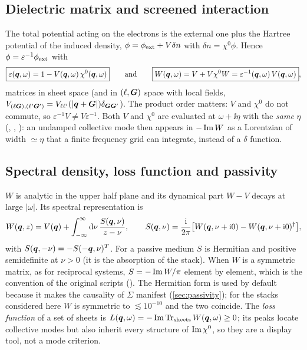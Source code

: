 \subsection{Dielectric matrix and screened interaction}

The total potential acting on the electrons is the external one plus the Hartree potential of the induced
density, $\phi=\phi_{\rm ext}+V\delta n$ with $\delta n=\chi^0\phi$. Hence $\phi=\varepsilon^{-1}\phi_{\rm ext}$ with
\begin{equation}
\boxed{\varepsilon(\bm q,\omega)=1-V(\bm q,\omega)\,\chi^0(\bm q,\omega)}
\qquad\text{and}\qquad
\boxed{W(\bm q,\omega)=V+V\chi^0W=\varepsilon^{-1}(\bm q,\omega)\,V(\bm q,\omega)} ,
\label{eq:epsW}
\end{equation}
matrices in sheet space (and in $(\ell,\bm G)$ space with local fields, $V_{(\ell\bm G),(\ell'\bm G')}=V_{\ell\ell'}(|\bm q+\bm G|)\delta_{\bm G\bm G'}$).
The product order matters: $V$ and $\chi^0$ do not commute, so $\varepsilon^{-1}V\ne V\varepsilon^{-1}$.
Both $V$ and $\chi^0$ are evaluated at $\omega+\ii\eta$ with the \emph{same} $\eta$
(, ,
): an undamped collective mode then appears in $-\operatorname{Im} W$ as a Lorentzian of
width $\simeq\eta$ that a finite frequency grid can integrate, instead of a $\delta$ function.

\subsection{Spectral density, loss function and passivity}
\label{sec:spectraldensity}

$W$ is analytic in the upper half plane and its dynamical part $W-V$ decays at large $|\omega|$. Its spectral
representation is
\begin{equation}
W(\bm q,z)=V(\bm q)+\int_{-\infty}^{\infty}\mathrm d\nu\,\frac{S(\bm q,\nu)}{z-\nu},\qquad
S(\bm q,\nu)=\frac{\mathrm i}{2\pi}\bigl[W(\bm q,\nu+\mathrm i0)-W(\bm q,\nu+\mathrm i0)^\dagger\bigr],
\label{eq:spectralrep}
\end{equation}
with $S(\bm q,-\nu)=-S(-\bm q,\nu)^{T}$. For a passive medium $S$ is Hermitian and positive semidefinite at $\nu>0$
(it is the absorption of the stack). When $W$ is a symmetric matrix, as for reciprocal systems,
$S=-\operatorname{Im} W/\pi$ element by element, which is the convention of the original scripts
(). The Hermitian form is used by default because it makes the
causality of $\Sigma$ manifest (\cref{sec:passivity}); for the stacks considered here $W$ is symmetric to
$\lesssim10^{-10}$ and the two coincide. The \emph{loss function} of a set of sheets is
$L(\bm q,\omega)=-\operatorname{Im}\operatorname{Tr}_{\rm sheets}W(\bm q,\omega)\ge0$; its peaks locate collective modes but also inherit every
structure of $\operatorname{Im}\chi^0$, so they are a display tool, not a mode criterion.

